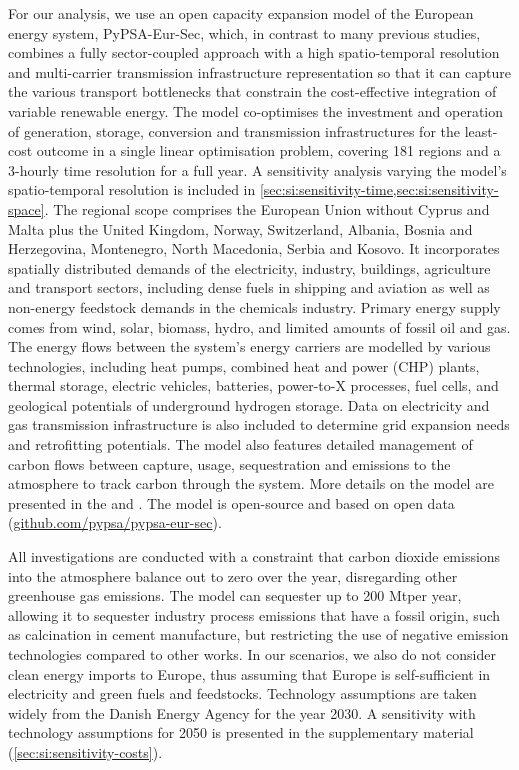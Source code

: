 For our analysis, we use an open capacity expansion model of the European energy
system, PyPSA-Eur-Sec, which, in contrast to many previous studies,
\cite{henningComprehensiveModel2014,mathiesenSmartEnergy2015,connollySmartEnergy2016,Loffler_2019,blancoPotentialHydrogen2018,brownSynergiesSector2018,in-depth_2018,victoria2020,ludererImpactDeclining2021}
combines a fully sector-coupled approach with a high spatio-temporal resolution
and multi-carrier transmission infrastructure representation so that it can
capture the various transport bottlenecks that constrain the cost-effective
integration of variable renewable energy.\cite{frysztackiStrongEffect2021} The
model co-optimises the investment and operation of generation, storage,
conversion and transmission infrastructures for the least-cost outcome in a
single linear optimisation problem, covering 181 regions and a 3-hourly time
resolution for a full year. A sensitivity analysis varying the model's
spatio-temporal resolution is included in
\cref{sec:si:sensitivity-time,sec:si:sensitivity-space}. The regional scope
comprises the European Union without Cyprus and Malta plus the United Kingdom,
Norway, Switzerland, Albania, Bosnia and Herzegovina, Montenegro, North
Macedonia, Serbia and Kosovo. It incorporates spatially distributed demands of
the electricity, industry, buildings, agriculture and transport sectors,
including dense fuels in shipping and aviation as well as non-energy feedstock
demands in the chemicals industry. Primary energy supply comes from wind, solar,
biomass, hydro, and limited amounts of fossil oil and gas. The energy flows
between the system's energy carriers are modelled by various technologies,
including heat pumps, combined heat and power (CHP) plants, thermal storage,
electric vehicles, batteries, power-to-X processes, fuel cells, and geological
potentials of underground hydrogen storage. Data on electricity and gas
transmission infrastructure is also included to determine grid expansion needs
and retrofitting potentials. The model also features detailed management of
carbon flows between capture, usage, sequestration and emissions to the
atmosphere to track carbon through the system. More details on the model are
presented in the  and . The model is
open-source and based on open data
(\href{https://github.com/pypsa/pypsa-eur-sec}{github.com/pypsa/pypsa-eur-sec}).

All investigations are conducted with a constraint that carbon dioxide emissions
into the atmosphere balance out to zero over the year, disregarding other
greenhouse gas emissions. The model can sequester up to 200 Mt\co per year,
allowing it to sequester industry process emissions that have a fossil origin,
such as calcination in cement manufacture, but restricting the use of negative
emission technologies compared to other works.
\cite{blancoPotentialHydrogen2018} In our scenarios, we also do not consider
clean energy imports to Europe, thus assuming that Europe is self-sufficient in
electricity and green fuels and feedstocks. Technology assumptions are taken
widely from the Danish Energy Agency for the year 2030.\cite{DEA} A sensitivity
with technology assumptions for 2050 is presented in the supplementary material
(\cref{sec:si:sensitivity-costs}).

